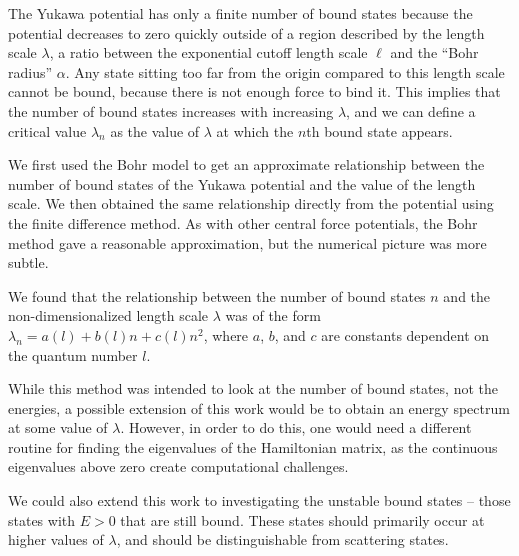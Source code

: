 \documentclass[12pt,twoside]{reedthesis}
\begin{document}
The Yukawa potential has only a finite number of bound states because the potential decreases to zero quickly outside of a region described by the length scale $\lambda$, a ratio between the exponential cutoff length scale $\ell$ and the ``Bohr radius'' $\alpha$. Any state sitting too far from the origin compared to this length scale cannot be bound, because there is not enough force to bind it. This implies that the number of bound states increases with increasing $\lambda$, and we can define a critical value $\lambda_n$ as the value of $\lambda$ at which the $n$th bound state appears.

We first used the Bohr model to get an approximate relationship between the number of bound states of the Yukawa potential and the value of the length scale. We then obtained the same relationship directly from the potential using the finite difference method. As with other central force potentials, the Bohr method gave a reasonable approximation, but the numerical picture was more subtle. 

We found that the relationship between the number of bound states $n$ and the non-dimensionalized length scale $\lambda$ was of the form $\lambda_n = a(l) + b(l)n + c(l)n^2$, where $a$, $b$, and $c$ are constants dependent on the quantum number $l$. 

While this method was intended to look at the number of bound states, not the energies, a possible extension of this work would be to obtain an energy spectrum at some value of $\lambda$. However, in order to do this, one would need a different routine for finding the eigenvalues of the Hamiltonian matrix, as the continuous eigenvalues above zero create computational challenges.

We could also extend this work to investigating the unstable bound states -- those states with $E > 0$ that are still bound. These states should primarily occur at higher values of $\lambda$, and should be distinguishable from scattering states. 


%
\appendix
\end{document}
